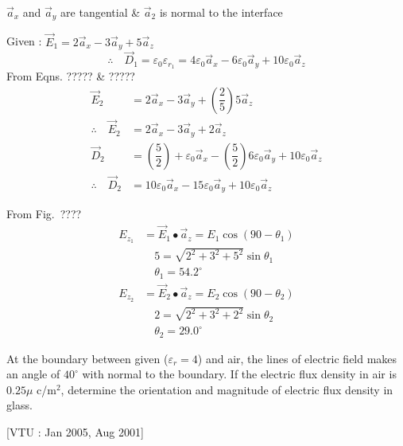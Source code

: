 \begin{solution}
$\overrightarrow{a}_{x}$ and $\overrightarrow{a}_{y}$ are tangential \& $\overrightarrow{a}_{2}$ is normal to the interface

Given : $\overrightarrow{E}_{1} = 2\overrightarrow{a}_{x} - 3\overrightarrow{a}_{y} + 5\overrightarrow{a}_{z}$
$$
\therefore\quad \overrightarrow{D}_{1} = \varepsilon_{0}\varepsilon_{r_{1}} = 4\varepsilon_{0}\overrightarrow{a}_{x} - 6\varepsilon_{0}\overrightarrow{a}_{y} + 10\varepsilon_{0}\overrightarrow{a}_{z}
$$
From Eqns. ????? \& ?????
\begin{align*}
\overrightarrow{E}_{2} & = 2\overrightarrow{a}_{x} - 3\overrightarrow{a}_{y} + \left(\dfrac{2}{5}\right) 5\overrightarrow{a}_{z}\\
\therefore\quad \overrightarrow{E}_{2} & = 2\overrightarrow{a}_{x} - 3\overrightarrow{a}_{y} + 2\overrightarrow{a}_{z}\\
\overrightarrow{D}_{2} & = \left(\dfrac{5}{2}\right) + \varepsilon_{0}\overrightarrow{a}_{x} - \left(\dfrac{5}{2}\right) 6\varepsilon_{0}\overrightarrow{a}_{y} + 10\varepsilon_{0}\overrightarrow{a}_{z}\\
\therefore\quad \overrightarrow{D}_{2} & = 10\varepsilon_{0}\overrightarrow{a}_{x} - 15\varepsilon_{0}\overrightarrow{a}_{y} + 10\varepsilon_{0}\overrightarrow{a}_{z}
\end{align*}

From Fig.~????
\begin{align*}
E_{z_{1}} & = \overrightarrow{E}_{1} \bullet \overrightarrow{a}_{z} = E_{1} \cos (90 - \theta_{1})\\
&\quad 5 = \sqrt{2^{2} + 3^{2} + 5^{2}} \sin \theta_{1}\\
&\quad \theta_{1} = 54.2^{\circ}\\[0.3cm]
E_{z_{2}} & = \overrightarrow{E}_{2} \bullet \overrightarrow{a}_{z} = E_{2} \cos (90 - \theta_{2})\\
&\quad 2 = \sqrt{2^{2} + 3^{2} + 2^{2}} \sin \theta_{2}\\
&\quad \theta_{2} = 29.0^{\circ}
\end{align*}
\end{solution}

\begin{problem}
At the boundary between given ($\varepsilon_{r} = 4$) and air, the lines of electric field makes an angle of $40^{\circ}$ with normal to the boundary. If the electric flux density in air is $0.25 \mu$ c/m$^{2}$, determine the orientation and magnitude of electric flux density in glass. 

\hfill [VTU : Jan 2005, Aug 2001]
\end{problem}

